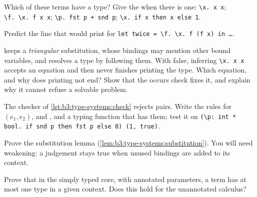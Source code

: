 \begin{exercise}[$\star$]\label{exo:b3:type-systems:3}
Which of these terms have a type? Give the  when there is one: \texttt{\textbackslash{}x.\ x x}; \texttt{\textbackslash{}f.\ \textbackslash{}x.\ f x x}; \texttt{\textbackslash{}p.\ fst p + snd p}; \texttt{\textbackslash{}x.\ if x then x else 1}.
\end{exercise}

\begin{exercise}[$\star$]\label{exo:b3:type-systems:4}
Predict the line that  would print for \texttt{let twice = \textbackslash{}f.\ \textbackslash{}x.\ f (f x) in \dots{}}.
\end{exercise}

\begin{exercise}[$\star\star$]\label{exo:b3:type-systems:5}
 keeps a \emph{triangular} substitution, whose bindings may mention other bound variables, and resolves a type by following them. With  false, inferring \texttt{\textbackslash{}x.\ x x} accepts an equation and then never finishes printing the type. Which equation, and why does printing not end? Show that the occurs check fixes it, and explain why it cannot refuse a solvable problem.
\end{exercise}

\begin{exercise}[$\star\star$]\label{exo:b3:type-systems:6}
The checker of \cref{lst:b3:type-systems:check} rejects pairs. Write the rules for $(e_1, e_2)$,  and , and a typing function that has them; test it on \texttt{(\textbackslash{}p:\ int * bool.\ if snd p then fst p else 0) (1, true)}.
\end{exercise}

\begin{exercise}[$\star\star$]\label{exo:b3:type-systems:7}
Prove the substitution lemma (\cref{lem:b3:type-systems:substitution}). You will need weakening: a judgement stays true when unused bindings are added to its context.
\end{exercise}

\begin{exercise}[$\star\star$]\label{exo:b3:type-systems:8}
Prove that in the simply typed core, with annotated parameters, a term has at most one type in a given context. Does this hold for the unannotated calculus?
\end{exercise}

